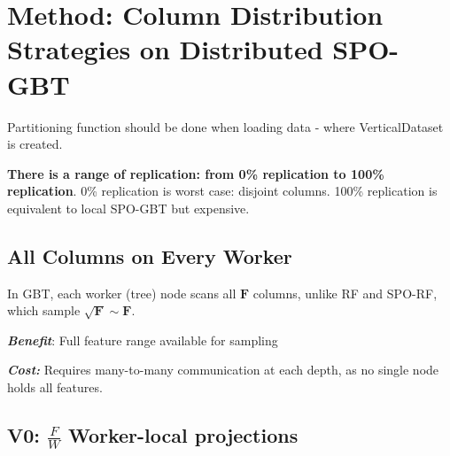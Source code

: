 \documentclass[sigconf,screen]{acmart}
\begin{document}
\section{Method: Column Distribution Strategies on Distributed SPO-GBT}

Partitioning function should be done when loading data - where VerticalDataset is created. 

\textbf{There is a range of replication: from 0\% replication to 100\% replication}. 0\% replication is worst case: disjoint columns. 100\% replication is equivalent to local SPO-GBT but expensive.

\subsection{All Columns on Every Worker}

In GBT, each worker (tree) node scans all $\mathbf{F}$ columns, unlike RF and SPO-RF, which sample $\sqrt{\mathbf{F}} \sim \mathbf{F}$. \newline\mbox{}

\textbf{\textit{Benefit}}: Full feature range available for sampling

\textbf{\textit{Cost:}} Requires many-to-many communication at each depth, as no single node holds all features.


\subsection{V0: \texorpdfstring{$\frac{F}{W}$}{F/W} Worker-local projections}


\end{document}
